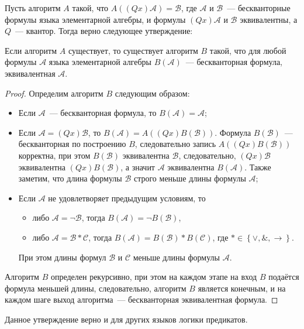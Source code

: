 Пусть алгоритм $A$ такой, что $A\left(\left(Qx\right)\mathcal{A}\right) = \mathcal{B}$, где $\mathcal{A}$ и $\mathcal{B}$~--- бескванторные формулы языка элементарной алгебры, и формулы $(Qx)\mathcal{A}$ и $\mathcal{B}$ эквивалентны, а $Q$~--- квантор. Тогда верно следующее утверждение:
\begin{proposal}\label{algB}
    Если алгоритм $A$ существует, то существует алгоритм $B$ такой, что для любой формулы $\mathcal{A}$ языка элементарной алгебры $B\left(\mathcal{A}\right)$~--- бескванторная формула, эквивалентная $\mathcal{A}$.
\end{proposal}   
\begin{proof}
    Определим алгоритм $B$ следующим образом:
    \begin{itemize}
        \item Если $\mathcal{A}$~--- бескванторная формула, то $B\left(\mathcal{A}\right) = \mathcal{A}$;
        \item Если $\mathcal{A} = \left(Qx\right)\mathcal{B}$, то $B\left(\mathcal{A}\right) = A\left(\left(Qx\right)B\left(\mathcal{B}\right)\right)$. Формула $B\left(\mathcal{B}\right)$~--- бескванторная по построению $B$, следовательно запись $A\left(\left(Qx\right)B\left(\mathcal{B}\right)\right)$ корректна, при этом $B\left(\mathcal{B}\right)$ эквивалентна $\mathcal{B}$, следовательно, $\left(Qx\right)\mathcal{B}$ эквивалентна $\left(Qx\right)B\left(\mathcal{B}\right)$, а значит $\mathcal{A}$ эквивалентна $B\left(\mathcal{A}\right)$. Также заметим, что длина формулы $\mathcal{B}$ строго меньше длины формулы $\mathcal{A}$;
        \item Если $\mathcal{A}$ не удовлетворяет предыдущим условиям, то
        \begin{itemize}
            \item либо $\mathcal{A} = \lnot \mathcal{B}$, тогда $B\left(\mathcal{A}\right) = \lnot B\left(\mathcal{B}\right)$,
            \item либо $\mathcal{A} = \mathcal{B} * \mathcal{C}$, тогда $B\left(\mathcal{A}\right) = B\left(\mathcal{B}\right) * B\left(\mathcal{C}\right)$, где $* \in \left\{\lor, \&, \to\right\}$.
        \end{itemize}
        При этом длины формул $\mathcal{B}$ и $\mathcal{C}$ меньше длины формулы $\mathcal{A}$.
    \end{itemize}
    Алгоритм $B$ определен рекурсивно, при этом на каждом этапе на вход $B$ подаётся формула меньшей длины, следовательно, алгоритм $B$ является конечным, и на каждом шаге выход алгоритма~--- бескванторная эквивалентная формула.
\end{proof} 
    Данное утверждение верно и для других языков логики предикатов.

